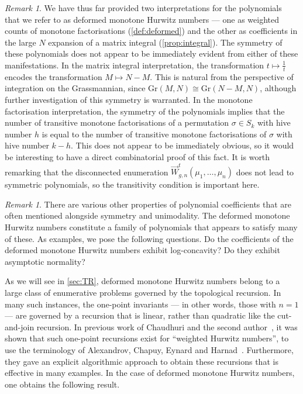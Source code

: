 \documentclass[a4paper]{article}
\theoremstyle{plain}
\numberwithin{theorem}{section}
\theoremstyle{definition}
\theoremstyle{remark}
\newtheorem{remark}[theorem]{Remark}
\newcommand{\dHN}[3]{\vec{W}^t_{#1,#2}(#3)}
\begin{document}
\begin{remark}
We have thus far provided two interpretations for the polynomials that we refer to as deformed monotone Hurwitz numbers --- one as weighted counts of monotone factorisations (\cref{def:deformed}) and the other as coefficients in the large $N$ expansion of a matrix integral (\cref{prop:integral}). The symmetry of these polynomials does not appear to be immediately evident from either of these manifestations. In the matrix integral interpretation, the transformation $t \mapsto \frac{1}{t}$ encodes the transformation $M \mapsto N-M$. This is natural from the perspective of integration on the Grassmannian, since $\mathrm{Gr}(M,N) \cong \mathrm{Gr}(N-M,N)$, although further investigation of this symmetry is warranted. In the monotone factorisation interpretation, the symmetry of the polynomials implies that the number of transitive monotone factorisations of a permutation $\sigma \in S_k$ with hive number $h$ is equal to the number of transitive monotone factorisations of $\sigma$ with hive number $k-h$. This does not appear to be immediately obvious, so it would be interesting to have a direct combinatorial proof of this fact. It is worth remarking that the disconnected enumeration $\dHN{g}{n}{\mu_1, \ldots, \mu_n}$ does not lead to symmetric polynomials, so the transitivity condition is important here.
\end{remark}


\begin{remark}
There are various other properties of polynomial coefficients that are often mentioned alongside symmetry and unimodality. The deformed monotone Hurwitz numbers constitute a family of polynomials that appears to satisfy many of these. As examples, we pose the following questions. Do the coefficients of the deformed monotone Hurwitz numbers exhibit log-concavity? Do they exhibit asymptotic normality?
\end{remark}


As we will see in \cref{sec:TR}, deformed monotone Hurwitz numbers belong to a large class of enumerative problems governed by the topological recursion. In many such instances, the one-point invariants --- in other words, those with $n = 1$ --- are governed by a recursion that is linear, rather than quadratic like the cut-and-join recursion. In previous work of Chaudhuri and the second author~\cite{cha-do21}, it was shown that such one-point recursions exist for ``weighted Hurwitz numbers'', to use the terminology of Alexandrov, Chapuy, Eynard and Harnad~\cite{ACEH20}. Furthermore, they gave an explicit algorithmic approach to obtain these recursions that is effective in many examples. In the case of deformed monotone Hurwitz numbers, one obtains the following result.
\end{document}
